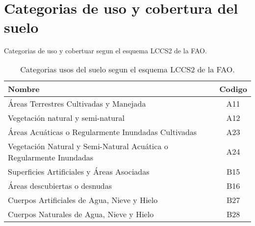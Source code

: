 \documentclass[hidelinks,12pt]{article}
\begin{document}
\section{Categorias de uso y cobertura del suelo}
Categorias de uso y cobertuar segun el esquema LCCS2 de la FAO.
\begin{table}[hbt]
    \centering
    \begin{tabular}{lc}
        \toprule
        Nombre & Codigo\\
        \midrule 
        Áreas Terrestres Cultivadas y Manejada & A11 \\
        Vegetación natural y semi-natural & A12 \\
        Áreas Acuáticas o Regularmente Inundadas Cultivadas & A23  \\
        Vegetación Natural y Semi-Natural Acuática o
	Regularmente Inundadas & A24 \\
        Superficies Artificiales y Áreas Asociadas & B15  \\
        Áreas descubiertas o desnudas & B16 \\
        Cuerpos Artificiales de Agua, Nieve y Hielo & B27 \\
        Cuerpos Naturales de Agua, Nieve y Hielo & B28\\
        \bottomrule
    \end{tabular}
\caption{\label{tabla1}Categorias usos del suelo segun el esquema LCCS2 de la
FAO.}
\end{table}

\end{document}
